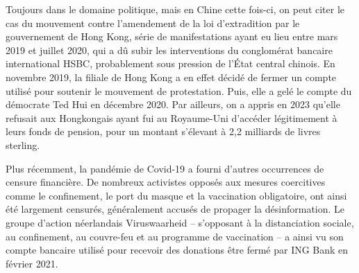 
Toujours dans le domaine politique, mais en Chine cette fois-ci, on peut citer le cas du mouvement contre l'amendement de la loi d'extradition par le gouvernement de Hong Kong, série de manifestations ayant eu lieu entre mars 2019 et juillet 2020, qui a dû subir les interventions du conglomérat bancaire international HSBC, probablement sous pression de l'État central chinois. En novembre 2019, la filiale de Hong Kong a en effet décidé de fermer un compte utilisé pour soutenir le mouvement de protestation. Puis, elle a gelé le compte du démocrate Ted Hui en décembre 2020. Par ailleurs, on a appris en 2023 qu'elle refusait aux Hongkongais ayant fui au Royaume-Uni d'accéder légitimement à leurs fonds de pension, pour un montant s'élevant à 2,2 milliards de livres sterling.

Plus récemment, la pandémie de Covid-19 a fourni d'autres occurrences de censure financière. De nombreux activistes opposés aux mesures coercitives comme le confinement, le port du masque et la vaccination obligatoire, ont ainsi été largement censurés, généralement accusés de propager la désinformation. Le groupe d'action néerlandais Viruswaarheid -- s'opposant à la distanciation sociale, au confinement, au couvre-feu et au programme de vaccination -- a ainsi vu son compte bancaire utilisé pour recevoir des donations être fermé par ING Bank en février 2021.

